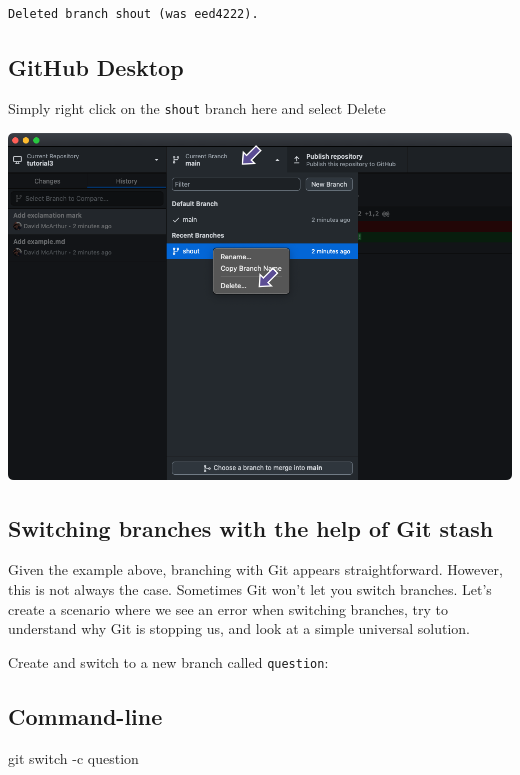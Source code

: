 \documentclass[
  letterpaper,
  DIV=11,
  numbers=noendperiod]{scrartcl}
\newenvironment{Shaded}{\begin{snugshade}}{\end{snugshade}}
\newcommand{\ControlFlowTok}[1]{\textcolor[rgb]{0.00,0.23,0.31}{#1}}
\newcommand{\NormalTok}[1]{\textcolor[rgb]{0.00,0.23,0.31}{#1}}
\newcommand{\SpecialCharTok}[1]{\textcolor[rgb]{0.37,0.37,0.37}{#1}}
\begin{document}
\begin{verbatim}

Deleted branch shout (was eed4222).
\end{verbatim}

\subsection{GitHub Desktop}

Simply right click on the \texttt{shout} branch here and select Delete

\includegraphics{images/image36.png}

\subsection{Switching branches with the help of Git
stash}\label{switching-branches-with-the-help-of-git-stash}

Given the example above, branching with Git appears straightforward.
However, this is not always the case. Sometimes Git won't let you switch
branches. Let's create a scenario where we see an error when switching
branches, try to understand why Git is stopping us, and look at a simple
universal solution.

Create and switch to a new branch called \texttt{question}:

\subsection{Command-line}

\begin{Shaded}
\begin{Highlighting}[]
\NormalTok{git }\ControlFlowTok{switch} \SpecialCharTok{{-}}\NormalTok{c question}
\end{Highlighting}
\end{Shaded}
\end{document}
